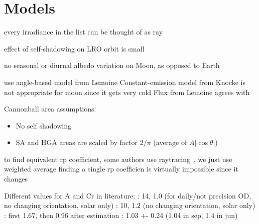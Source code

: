 \section{Models}

every irradiance in the list can be thought of as ray

effect of self-shadowing on LRO orbit is small~\cite{Loecher2018}

no seasonal or diurnal albedo variation on Moon, as opposed to Earth~\cite{Knocke1989}

use angle-based model from Lemoine
Constant-emission model from Knocke is not appropriate for moon since it gets very cold
Flux from Lemoine agrees with \cite[Table~8]{Tooley2010}


Cannonball area assumptions:
\begin{itemize}
    \item No self shadowing
    \item SA and HGA areas are scaled by factor $2/\pi$ (average of $A|\cos\theta|$)
\end{itemize}
to find equivalent rp coefficient, some authors use raytracing~\cite{Hattori2019}, we just use weighted average
finding a single rp coefficien is virtually impossible since it changes~\cite[p~580]{Vallado2013}

Different values for A and Cr in literature:
\cite{Nicholson2010}: 14, 1.0 (for daily/not precision OD, no changing orientation, solar only)
\cite{Bauer2016}: 10, 1.2 (no changing orientation, solar only)
\cite{Slojkowski2015}: first 1.67, then 0.96 after estimation
\cite{Mazarico2018}: 1.03 +- 0.24 (1.04 in sep, 1.4 in jun)

